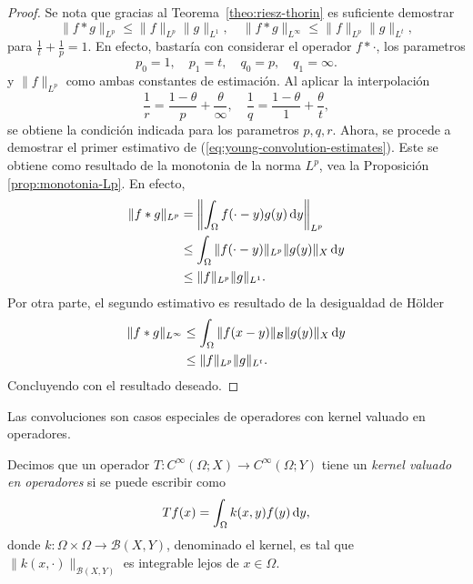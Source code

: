 \begin{proof}
    Se nota que gracias al Teorema~\ref{theo:riesz-thorin} es suficiente 
    demostrar 
    \begin{equation}\label{eq:young-convolution-estimates}
        \|f*g\|_{L^p} \leq \|f\|_{L^p} \|g\|_{L^1}, \quad 
        \|f*g\|_{L^\infty} \leq \|f\|_{L^p} \|g\|_{L^t},
    \end{equation}
    para $\frac{1}{t} + \frac{1}{p} = 1$. En efecto, bastaría con considerar 
    el operador $f * \cdot$, los parametros
    \begin{equation*}
        p_0 = 1, \quad p_1 = t, \quad q_0 = p, \quad q_1 = \infty.
    \end{equation*}
    y $\|f\|_{L^p}$ como ambas constantes de estimación.
    Al aplicar la interpolación
    \begin{equation*}
        \frac{1}{r} = \frac{1-\theta}{p} + \frac{\theta}{\infty}, \quad 
        \frac{1}{q} = \frac{1-\theta}{1} + \frac{\theta}{t},
    \end{equation*}
    se obtiene la condición indicada para los parametros $p, q, r$. Ahora, 
    se procede a demostrar el primer estimativo de
    (\ref{eq:young-convolution-estimates}). Este se obtiene como resultado de
    la monotonia de la norma $L^p$, vea la Proposición \ref{prop:monotonia-Lp}.
    En efecto,
    \begin{align*}
        \|f*g\|_{L^p} & = \left\| \int_{\Omega} f(\cdot-y)g(y)\mathop{}\!\mathrm{d} y 
        \right\|_{L^p} \\
        & \leq \int_{\Omega} \|f(\cdot-y)\|_{L^p} \|g(y)\|_X\mathop{}\!\mathrm{d} y \\
        & \leq \|f\|_{L^p}\|g\|_{L^1}.
    \end{align*}
    Por otra parte, el segundo estimativo es resultado de la desigualdad de 
    H\"older 
    \begin{align*}
        \|f*g\|_{L^\infty} & \leq \int_{\Omega} \|f(x-y)\|_\mathcal{B}\|g(y)\|_X \mathop{}\!\mathrm{d} y \\
        & \leq \|f\|_{L^p}\|g\|_{L^t}.
    \end{align*}
    Concluyendo con el resultado deseado.
\end{proof}
Las convoluciones son casos especiales de operadores con kernel valuado en operadores.
\begin{definition}
	Decimos que un operador $T:C^\infty(\Omega;X)\rightarrow C^\infty(\Omega;Y)$ tiene un \textit{kernel valuado en operadores} si se puede escribir como
	\begin{equation*}
		Tf(x) = \int_{\Omega}k(x, y)f(y)\mathop{}\!\mathrm{d} y,
	\end{equation*}
	donde $k:\Omega\times\Omega \rightarrow \mathcal{B}(X,Y)$, denominado el kernel, es tal que $\|k(x, \cdot)\|_{\mathcal{B}(X,Y)}$ es integrable lejos de $x \in \Omega $.
	\label{def:operator-kernel}
\end{definition}
